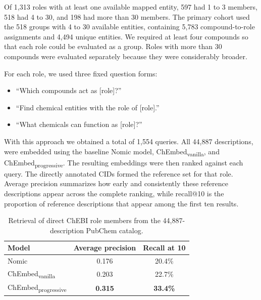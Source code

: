 \documentclass[twoside,twocolumn,9pt]{article}
\begin{document}
Of 1,313 roles with at least one available mapped entity, 597 had 1 to 3 members, 518 had 4 to 30, and 198 had more than 30 members. The primary cohort used the 518 groups with 4 to 30 available entities, containing 5,783 compound-to-role assignments and 4,494 unique entities. We required at least four compounds so that each role could be evaluated as a group. Roles with more than 30 compounds were evaluated separately because they were considerably broader.

For each role, we used three fixed question forms:
\begin{itemize}
    \setlength\itemsep{0em}
    \item ``Which compounds act as [role]?''
    \item ``Find chemical entities with the role of [role].''
    \item ``What chemicals can function as [role]?''
\end{itemize}

With this approach we obtained a total of 1,554 queries. All 44,887 descriptions, were embedded using the baseline Nomic model, ChEmbed\textsubscript{vanilla}, and ChEmbed\textsubscript{progressive}. The resulting embeddings were then ranked against each query. The directly annotated CIDs formed the reference set for that role. Average precision summarizes how early and consistently these reference descriptions appear across the complete ranking, while recall@10 is the proportion of reference descriptions that appear among the first ten results.

\begin{table}[!b]
\centering
\caption{Retrieval of direct ChEBI role members from the 44,887-description PubChem catalog.}
\label{tab:chebi-role-retrieval}
\setlength{\tabcolsep}{4pt}
\begin{tabular}{lcc}
\toprule
Model & Average precision & Recall at 10 \\
\midrule
Nomic & 0.176 & 20.4\% \\
ChEmbed\textsubscript{vanilla} & 0.203 & 22.7\% \\
ChEmbed\textsubscript{progressive} & \textbf{0.315} & \textbf{33.4\%} \\
\bottomrule
\end{tabular}
\end{table}
\end{document}
